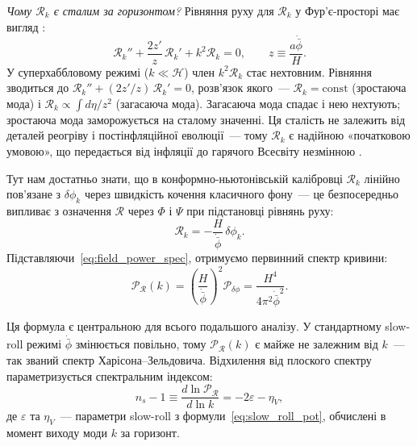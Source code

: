 \documentclass[12pt, a4paper]{article}
\begin{document}
\textit{Чому $\mathcal{R}_k$ є сталим за горизонтом?}
Рівняння руху для $\mathcal{R}_k$ у Фур'є-просторі має вигляд
\cite{bardeen_1980}:
\begin{equation}\label{eq:R_eom}
  \mathcal{R}_k'' + \frac{2z'}{z}\,\mathcal{R}_k' + k^2\mathcal{R}_k = 0,
  \qquad z \equiv \frac{a\dot{\bar\phi}}{H}.
\end{equation}
У суперхаббловому режимі ($k \ll \mathcal{H}$) член $k^2\mathcal{R}_k$
стає нехтовним. Рівняння зводиться до
$\mathcal{R}_k'' + (2z'/z)\,\mathcal{R}_k' = 0$,
розв'язок якого~--- $\mathcal{R}_k = \mathrm{const}$ (зростаюча мода)
і $\mathcal{R}_k \propto \int d\eta/z^2$ (загасаюча мода).
Загасаюча мода спадає і нею нехтують; зростаюча мода заморожується
на сталому значенні. Ця сталість не залежить від деталей реогріву і
постінфляційної еволюції~--- тому $\mathcal{R}_k$ є надійною
«початковою умовою», що передається від інфляції до гарячого
Всесвіту незмінною \cite{bardeen_1980}.

Тут нам достатньо знати, що в конформно-ньютонівській калібровці
$\mathcal{R}_k$ лінійно пов'язане з $\delta\phi_k$ через швидкість
кочення класичного фону~--- це безпосередньо випливає з означення
$\mathcal{R}$ через $\Phi$ і $\Psi$ при підстановці рівнянь руху:
\begin{equation}\label{eq:curvature_perturbation}
  \mathcal{R}_k = -\frac{H}{\dot{\bar{\phi}}}\,\delta\phi_k.
\end{equation}
Підставляючи~\eqref{eq:field_power_spec}, отримуємо первинний
спектр кривини:
\begin{equation}\label{eq:curvature_power_spec}
  \mathcal{P}_{\mathcal{R}}(k)
    = \left(\frac{H}{\dot{\bar{\phi}}}\right)^{\!2}
      \mathcal{P}_{\delta\phi}
    = \frac{H^4}{4\pi^2\dot{\bar{\phi}}^2}.
\end{equation}

Ця формула є центральною для всього подальшого аналізу. У
стандартному slow-roll режимі $\dot{\bar\phi}$ змінюється
повільно, тому $\mathcal{P}_{\mathcal{R}}(k)$ є майже не
залежним від $k$~--- так званий спектр Харісона--Зельдовича.
Відхилення від плоского спектру параметризується спектральним
індексом:
\begin{equation}\label{eq:ns}
  n_s - 1 \equiv \frac{d\ln\mathcal{P}_{\mathcal{R}}}{d\ln k}
            = -2\varepsilon - \eta_V,
\end{equation}
де $\varepsilon$ та $\eta_V$~--- параметри slow-roll з
формули~\eqref{eq:slow_roll_pot}, обчислені в момент виходу
моди $k$ за горизонт.
\end{document}
